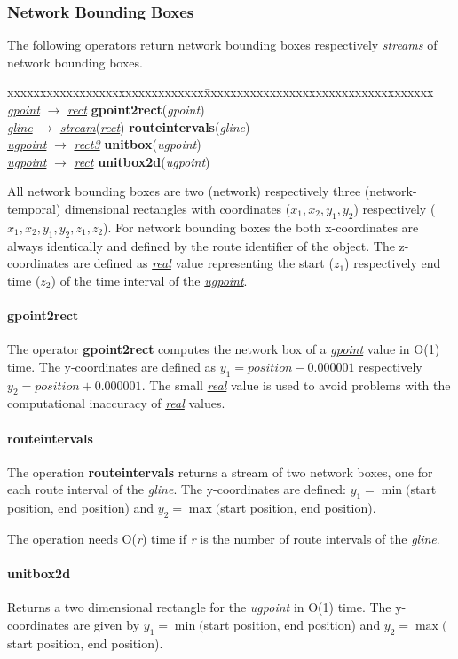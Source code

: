 \documentclass[a4paper]{article}
\newcommand{\op}[1]{\textbf{#1}}
\newcommand{\var}[1]{\textsl{#1}}
\newcommand{\dt}[1]{\textsl{\underline{#1}}}
\begin{document}
\subsubsection{Network Bounding Boxes}
The following operators return network bounding boxes respectively \dt{streams} of network bounding boxes.
\begin{tabbing}
xxxxxxxxxxxxxxxxxxxxxxxxxxxxxx\=xxxxxxxxxxxxxxxxxxxxxxxxxxxxxxxxxxx\kill
\dt{gpoint} $\rightarrow$ \dt{rect} \> \op{gpoint2rect}(\var{gpoint}) \\
\dt{gline} $\rightarrow$ \dt{stream}(\dt{rect}) \> \op{routeintervals}(\var{gline})\\
\dt{ugpoint} $\rightarrow$ \dt{rect3} \> \op{unitbox}(\var{ugpoint})\\
\dt{ugpoint} $\rightarrow$ \dt{rect} \> \op{unitbox2d}(\var{ugpoint})\\
\end{tabbing}
All network bounding boxes are two (network) respectively three (network-temporal) dimensional rectangles with coordinates ($x_1, x_2, y_1, y_2$) respectively ($x_1, x_2, y_1, y_2, z_1, z_2$). For network bounding boxes the both x-coordinates are always identically and defined by the route identifier of the object. The z-coordinates are defined as \dt{real} value representing the start ($z_1$) respectively end time ($z_2$) of the time interval of the \dt{ugpoint}.
\paragraph{\op{gpoint2rect}}
The operator \op{gpoint2rect} computes the network box of a \dt{gpoint} value in O(1) time. The y-coordinates are defined as $y_1 = position - 0.000001$ respectively $y_2 = position + 0.000001$. The small \dt{real} value is used to avoid problems with the computational inaccuracy of \dt{real} values.
\paragraph{\op{routeintervals}}
The operation \op{routeintervals} returns a stream of two network boxes, one for each route interval of the \var{gline}. The  y-coordinates are defined:  $y_1 = \min($start position, end position) and  $y_2 = \max($start position, end position).

The operation needs O(\var{r}) time if \var{r} is the number of route intervals of the  \var{gline}.
\paragraph{\op{unitbox2d}}
Returns a two dimensional rectangle for the \var{ugpoint} in O(1) time. The y-coordinates are given by $y_1 = \min($start position, end position) and $y_2 = \max($start position, end position).
\end{document}
